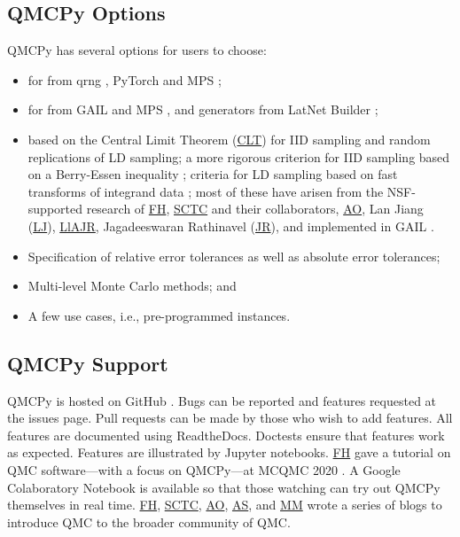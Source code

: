 \documentclass[11pt]{NSFamsart}
\newcommand{\FH}{\hyperlink{FHlink}{FH}\xspace}
\newcommand{\SCTC}{\hyperlink{SCTClink}{SCTC}\xspace}
\newcommand{\AO}{\hyperlink{AOlink}{AO}\xspace}
\newcommand{\MM}{\hyperlink{MMlink}{MM}\xspace}
\newcommand{\JR}{\hyperlink{JRlink}{JR}\xspace}
\newcommand{\LlAJR}{\hyperlink{LlAJRlink}{LlAJR}\xspace}
\newcommand{\LJ}{\hyperlink{LJlink}{LJ}\xspace}
\newcommand{\AS}{\hyperlink{ASlink}{AS}\xspace}
\newcommand{\CLT}{\hyperlink{CLTlink}{CLT}\xspace}
\begin{document}
 \subsection{QMCPy Options}
 QMCPy has several options for users to choose:
 \begin{itemize}
 	\item {} for  from  qrng \cite{QRNG2020},  PyTorch \cite{PyTorch} and MPS \cite{Nuy17a};

 	\item {} for  from GAIL \cite{ChoEtal20a} and MPS \cite{Nuy17a}, and generators  from LatNet Builder \cite{LatNet};

 	\item {} based on the \hypertarget{CLTlink}{Central Limit Theorem} (\CLT) for IID sampling and random replications of LD sampling;  a more rigorous criterion for IID sampling based on a Berry-Essen inequality \cite{HicEtal14a};  criteria for LD sampling based on fast transforms of integrand data \cite{HicJim16a, JimHic16a,RatHic19a}; most of these have arisen from the NSF-supported research of \FH, \SCTC and their collaborators, \AO, \hypertarget{LJlink}{Lan Jiang} (\LJ),
 	\LlAJR, \hypertarget{JRlink}{Jagadeeswaran Rathinavel} (\JR), and implemented in GAIL \cite{ChoEtal20a}.

 	\item Specification of relative error tolerances as well as absolute error tolerances;

 	\item Multi-level Monte Carlo methods; and

 	\item A few use cases, i.e., pre-programmed  instances.
 \end{itemize}

\subsection{QMCPy Support}
QMCPy is hosted on GitHub \cite{QMCPy2020a}. Bugs can be reported and features requested at the issues page.  Pull requests can be made by those who wish to add features.  All features are documented \cite{QMCPyDocs} using ReadtheDocs.  Doctests ensure that features work as expected. Features are illustrated by Jupyter notebooks.  \FH gave a tutorial on QMC software---with a focus on QMCPy---at MCQMC 2020 \cite{MCQMC2020QMCPyTut}.  A Google Colaboratory Notebook \cite{QMCPyTutColab2020} is available so that those watching  can try out QMCPy themselves in real time.  \FH, \SCTC, \AO, \AS, and \MM wrote a series of blogs \cite{QMCBlog} to introduce QMC to the broader community of QMC.
\end{document}
